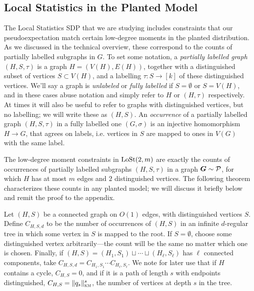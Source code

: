 \begin{lemma}
\subsection{Local Statistics in the Planted Model} %
\label{sub:local_statistics_in_the_planted_model}

The Local Statistics SDP that we are studying includes constraints that our pseudoexpectation match certain low-degree moments in the planted distribution. As we discussed in the technical overview, these correspond to the counts of partially labelled subgraphs in $G$. To set some notation, a \textit{partially labelled graph} $(H,S,\tau)$ is a graph $H = (V(H),E(H))$, together with a distinguished subset of vertices $S \subset V(H)$, and a labelling $\tau : S \to [k]$ of these distinguished vertices. We'll say a graph is \emph{unlabeled} or \textit{fully labelled} if $S = \emptyset$ or $S = V(H)$, and in these cases abuse notation and simply refer to $H$ or $(H,\tau)$ respectively. At times it will also be useful to refer to graphs with distinguished vertices, but no labelling; we will write these as $(H,S)$. An \textit{occurrence} of a partially labelled graph $(H,S,\tau)$ in a fully labelled one $(G,\sigma)$ is an injective homomorphism $H \to G$, that agrees on labels, i.e. vertices in $S$ are mapped to ones in $V(G)$ with the same label.

The low-degree moment constraints in $\operatorname{LoSt}(2,m)$ are exactly the counts of occurrences of partially labelled subgraphs $(H,S,\tau)$ in a graph $\boldsymbol{G} \sim \mathcal{P}$, for which $H$ has at most $m$ edges and $2$ distinguished vertices. The following theorem characterizes these counts in any planted model; we will discuss it briefly below and remit the proof to the appendix.

\begin{definition}
    Let $(H,S)$ be a connected graph on $O(1)$ edges, with distinguished vertices $S$. Define $C_{H,S,d}$ to be the number of occurrences of $(H,S)$ in an infinite $d$-regular tree in which some vertex in $S$ is mapped to the root. If $S = \emptyset$, choose some distinguished vertex arbitrarily---the count will be the same no matter which one is chosen. Finally, if $(H,S) = (H_1,S_1) \sqcup \cdots \sqcup (H_\ell,S_\ell)$ has $\ell$ connected components, take $C_{H,S,d} = C_{H_1,S_1} \cdots C_{H_\ell,S_\ell}$. We note for later use that if $H$ contains a cycle, $C_{H,S} = 0$, and if it is a path of length $s$ with endpoints distinguished, $C_{H,S} = \|q_s\|^s_{\textsc{km}}$, the number of vertices at depth $s$ in the tree.
\end{definition}


\end{lemma}
